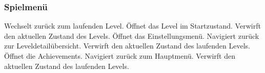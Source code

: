 \begin{center}
\setlength\fboxsep{20pt}
\setlength\fboxrule{1pt}
\end{center}

\subsubsection{Spielmenü}
\begin{requirements}
 Wechselt zurück zum laufenden Level.
 Öffnet das Level im Startzustand. Verwirft den aktuellen Zustand des Levels.
 Öffnet das Einstellungsmenü.
 Navigiert zurück zur Leveldetailübersicht. Verwirft den aktuellen Zustand des laufenden Levels.
 Öffnet die Achievements.
 Navigiert zurück zum Hauptmenü. Verwirft den aktuellen Zustand des laufenden Levels.
\end{requirements}

\begin{center}
\setlength\fboxsep{20pt}
\setlength\fboxrule{1pt}
\end{center}

